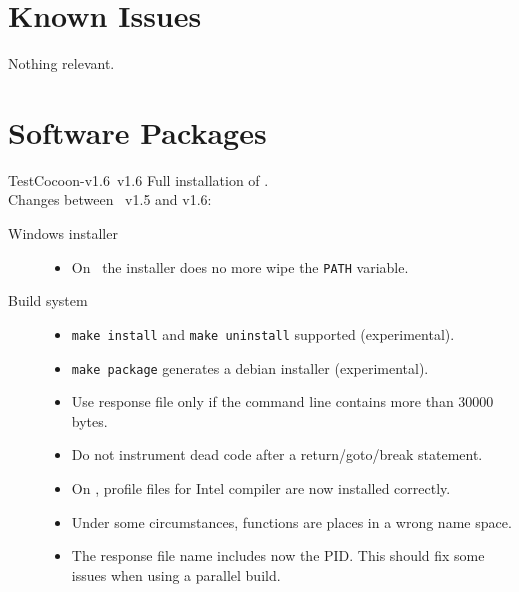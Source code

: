 \section{Known Issues}

Nothing relevant.


\section{Software Packages}


\begin{TestCocoonDownload}
\begin{TestCocoonDownloadLink}
\end{TestCocoonDownloadLink}
\begin{ReleaseNote}{TestCocoon-v1.6}{\TestCocoon\ v1.6}
Full installation of \TestCocoon.\\
Changes between \TestCocoon\ v1.5 and v1.6:
\begin{description}
\item[Windows installer]
  \begin{itemize}
    \item \BugFix On \MicrosoftWindows\ the installer does no more wipe the \verb$PATH$ variable.
  \end{itemize}
\item[Build system]
  \begin{itemize}
    \item \NewFeature \verb$make install$ and \verb$make uninstall$ supported (experimental).
    \item \NewFeature \verb$make package$ generates a debian installer (experimental).
  \end{itemize}
\item[\CoverageScanner]
  \begin{itemize}
    \item         Use response file only if the command line contains more than 30000 bytes.
    \item \NewFeature Do not instrument dead code after a return/goto/break statement.
    \item \BugFix On \Linux, profile files for Intel compiler are now installed correctly.
    \item \BugFix Under some circumstances, functions are places in a wrong name space.
    \item \BugFix The response file name includes now the PID. This should fix some issues when using a parallel build.

\end{itemize}
\end{description}
\end{ReleaseNote}
\end{TestCocoonDownload}
